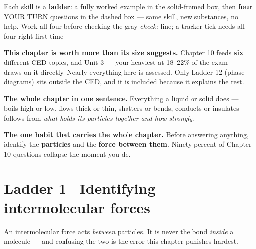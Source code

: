 \documentclass{apchem-worksheet}
\begin{document}
\apctitleblock

\begin{apcnote}
Each skill is a \textbf{ladder}: a fully worked example in the
solid-framed box, then \textbf{four} YOUR TURN questions in the dashed
box --- same skill, new substances, no help. Work all four before
checking the gray \emph{check:} line; a tracker tick needs all four
right first time.

\textbf{This chapter is worth more than its size suggests.} Chapter 10
feeds \textbf{six} different CED topics, and Unit 3 --- your heaviest at
18--22\% of the exam --- draws on it directly. Nearly everything here is
assessed. Only Ladder 12 (phase diagrams) sits outside the CED, and it
is included because it explains the rest.

\textbf{The whole chapter in one sentence.} Everything a liquid or solid
does --- boils high or low, flows thick or thin, shatters or bends,
conducts or insulates --- follows from \emph{what holds its particles
together and how strongly}.

\textbf{The one habit that carries the whole chapter.} Before answering
anything, identify the \textbf{particles} and the \textbf{force between
them}. Ninety percent of Chapter 10 questions collapse the moment you do.
\end{apcnote}

\section*{\sffamily Ladder 1 \textbullet\ Identifying intermolecular
forces}

An intermolecular force acts \emph{between} particles. It is never the
bond \emph{inside} a molecule --- and confusing the two is the error
this chapter punishes hardest.
\end{document}
